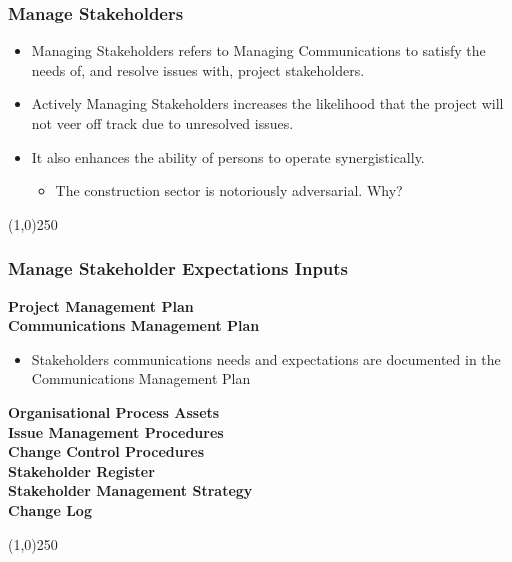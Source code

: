 \begin{frame}
\frametitle{Manage Stakeholders}
\begin{itemize}
	\item Managing Stakeholders refers to Managing Communications to satisfy the needs of, and resolve issues with, project stakeholders.
	\item Actively Managing Stakeholders increases the likelihood that the project will not veer off track due to unresolved issues.
	\item It also enhances the ability of persons to operate synergistically.
	\begin{itemize}
		\item The construction sector is notoriously adversarial.  Why?
	\end{itemize}
\end{itemize}
\end{frame}\begin{center}\line(1,0){250}\end{center}



\begin{frame}
\frametitle{Manage Stakeholder Expectations \hfill\hfill Inputs}
\textbf{Project Management Plan}\\
\textbf{Communications Management Plan}\\
\begin{itemize}
	\item Stakeholders communications needs and expectations are documented in the Communications Management Plan
\end{itemize}
\textbf{Organisational Process Assets}\\
\textbf{Issue Management Procedures}\\
\textbf{Change Control Procedures}\\
\textbf{Stakeholder Register}\\
\textbf{Stakeholder Management Strategy}\\
\textbf{Change Log}\\
\end{frame}\begin{center}\line(1,0){250}\end{center}


